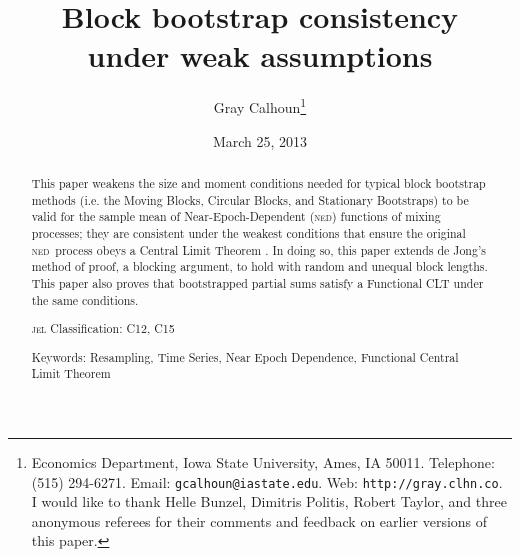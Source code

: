 \documentclass[11pt]{article}
\theoremstyle{definition}
\newcommand{\ned}{\textsc{ned}}
\begin{document}
\author{Gray Calhoun\thanks{Economics Department, Iowa State
    University, Ames, IA 50011. Telephone: (515) 294-6271.  Email:
    \texttt{gcalhoun@iastate.edu}. Web: \texttt{http://gray.clhn.co}.
    I would like to thank Helle Bunzel, Dimitris Politis, Robert
    Taylor, and three anonymous referees for their comments and
    feedback on earlier versions of this paper.}}

\title{Block bootstrap consistency\\under weak assumptions}

\date{March 25, 2013}
\maketitle

\begin{abstract}\noindent
  This paper weakens the size and moment conditions needed for typical
  block bootstrap methods (i.e. the Moving Blocks, Circular Blocks,
  and Stationary Bootstraps) to be valid for the sample mean of
  Near-Epoch-Dependent (\ned) functions of mixing processes; they are
  consistent under the weakest conditions that ensure the original
  \ned\ process obeys a Central Limit Theorem \citep[those
    of][\textit{Econometric Theory}]{Jon:97}.  In doing so, this paper
  extends de Jong's method of proof, a blocking argument, to hold with
  random and unequal block lengths.  This paper also proves that
  bootstrapped partial sums satisfy a Functional CLT under the same
  conditions.

  \noindent \textsc{jel} Classification: C12, C15

  \noindent Keywords: Resampling, Time Series, Near Epoch Dependence,
  Functional Central Limit Theorem
\end{abstract}
\end{document}
